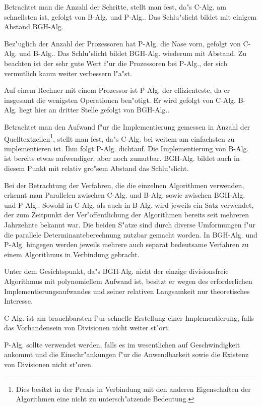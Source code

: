 Betrachtet man die Anzahl der Schritte, stellt man fest, da"s C-Alg. 
am schnellsten ist, gefolgt von B-Alg. und P-Alg.. Das Schlu"slicht 
bildet mit einigem Abstand BGH-Alg. 

Bez"uglich der Anzahl der Prozessoren hat P-Alg. die Nase vorn, gefolgt
von C-Alg. und B-Alg.. Das Schlu"slicht bildet BGH-Alg. wiederum mit
Abstand. Zu beachten ist der sehr gute Wert f"ur die Prozessoren bei P-Alg.,
der sich vermutlich kaum weiter verbessern l"a"st.

Auf einem Rechner mit einem Prozessor ist P-Alg. der effizienteste, da
er insgesamt die wenigsten Operationen ben"otigt. Er wird gefolgt von 
C-Alg. B-Alg. liegt hier an dritter Stelle gefolgt von BGH-Alg..

Betrachtet man den Aufwand f"ur die Implementierung gemessen in Anzahl der
Quelltextzeilen\footnote{Dies besitzt in der Praxis in Verbindung mit
den anderen Eigenschaften der Algorithmen eine nicht zu untersch"atzende 
Bedeutung.}, stellt man fest, da"s C-Alg. bei weitem am einfachsten 
zu implementieren ist. Ihm folgt P-Alg. dichtauf. Die Implementierung
von B-Alg. ist bereits etwas aufwendiger, aber noch zumutbar. BGH-Alg.
bildet auch in diesem Punkt mit relativ gro"sem Abstand das Schlu"slicht.

Bei der Betrachtung der Verfahren, die die einzelnen Algorithmen verwenden,
erkennt man Parallelen zwischen C-Alg. und B-Alg. sowie zwischen 
BGH-Alg. und P-Alg.. Sowohl in C-Alg. als auch in B-Alg. wird jeweils
ein Satz verwendet, der zum Zeitpunkt der Ver"offentlichung der Algorithmen
bereits seit mehreren Jahrzehnte bekannt war. Die beiden S"atze sind 
durch diverse Umformungen f"ur die parallele Determinanteberechnung nutzbar
gemacht worden. In BGH-Alg. und P-Alg. hingegen werden jeweils mehrere
auch separat bedeutsame Verfahren zu einem Algorithmus in Verbindung 
gebracht.

Unter dem Gesichtspunkt, da"s BGH-Alg. nicht der einzige divisionsfreie
Algorithmus mit polynomiellem Aufwand ist, besitzt er wegen des
erforderlichen Implementierungsaufwandes und seiner relativen Langsamkeit
nur theoretisches Interesse. 

C-Alg. ist am brauchbarsten f"ur schnelle Erstellung einer Implementierung,
falls das Vorhandensein von Divisionen nicht weiter st"ort.

P-Alg. sollte verwendet werden, falls es im wesentlichen auf Geschwindigkeit
ankommt und die Einschr"ankungen f"ur die Anwendbarkeit sowie die
Existenz von Divisionen nicht st"oren.

